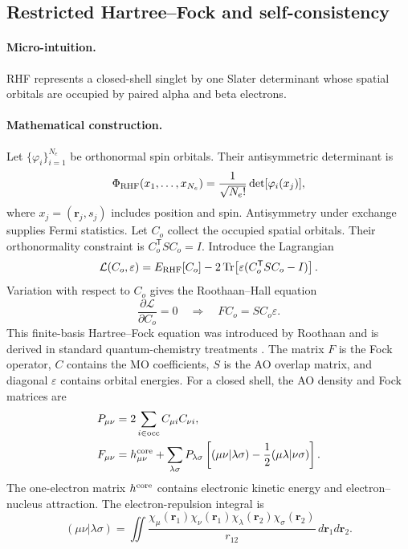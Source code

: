 \documentclass[10pt,twocolumn]{article}
\newcommand{\Tr}{\operatorname{Tr}}
\newcommand{\micro}{\paragraph{Micro-intuition.}}
\newcommand{\mathderiv}{\paragraph{Mathematical construction.}}
\begin{document}
\subsection*{Restricted Hartree--Fock and self-consistency}

\micro RHF represents a closed-shell singlet by one Slater determinant whose
spatial orbitals are occupied by paired alpha and beta electrons.

\mathderiv Let $\{\varphi_i\}_{i=1}^{N_e}$ be orthonormal spin orbitals.  Their
antisymmetric determinant is
\begin{equation}
\Phi_{\rm RHF}(x_1,\ldots,x_{N_e})
=\frac{1}{\sqrt{N_e!}}\det[\varphi_i(x_j)],
\label{eq:slater}
\end{equation}
where $x_j=(\mathbf r_j,s_j)$ includes position and spin.  Antisymmetry under
exchange supplies Fermi statistics.  Let $C_o$ collect the occupied spatial
orbitals.  Their orthonormality constraint is $C_o^{\mathsf T}SC_o=I$.
Introduce the Lagrangian
\begin{equation}
\mathcal L(C_o,\varepsilon)
=E_{\rm RHF}[C_o]
-2\Tr\!\left[\varepsilon(C_o^{\mathsf T}SC_o-I)\right].
\label{eq:rhf-lagrangian}
\end{equation}
Variation with respect to $C_o$ gives the Roothaan--Hall equation
\begin{equation}
\frac{\partial\mathcal L}{\partial C_o}=0
\quad\Longrightarrow\quad
FC_o=SC_o\varepsilon.
\label{eq:roothaan}
\end{equation}
This finite-basis Hartree--Fock equation was introduced by Roothaan
\cite{Roothaan} and is derived in standard quantum-chemistry treatments
\cite{SzaboOstlund}.
The matrix $F$ is the Fock operator, $C$ contains the MO coefficients,
$S$ is the AO overlap matrix, and diagonal $\varepsilon$ contains orbital
energies.  For a closed shell, the AO density and Fock matrices are
\begin{align}
P_{\mu\nu}&=2\sum_{i\in\mathrm{occ}}C_{\mu i}C_{\nu i},
\label{eq:density}\\
F_{\mu\nu}&=h^{\rm core}_{\mu\nu}
+\sum_{\lambda\sigma}P_{\lambda\sigma}
\left[(\mu\nu|\lambda\sigma)-\frac12(\mu\lambda|\nu\sigma)\right].
\label{eq:fock}
\end{align}
The one-electron matrix $h^{\rm core}$ contains electronic kinetic energy and
electron--nucleus attraction.  The electron-repulsion integral is
\begin{equation}
(\mu\nu|\lambda\sigma)=
\iint\frac{\chi_\mu(\mathbf r_1)\chi_\nu(\mathbf r_1)
\chi_\lambda(\mathbf r_2)\chi_\sigma(\mathbf r_2)}
{r_{12}}\,d\mathbf r_1d\mathbf r_2.
\label{eq:ao-eri}
\end{equation}
\end{document}
